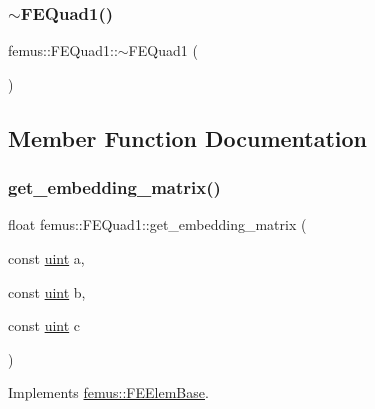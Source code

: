 \mbox{\label{classfemus_1_1_f_e_quad1_ad18511a0214fb48540a985da41b0aa0c}} 
\subsubsection{\texorpdfstring{$\sim$\+F\+E\+Quad1()}{~FEQuad1()}}
{\footnotesize\ttfamily femus\+::\+F\+E\+Quad1\+::$\sim$\+F\+E\+Quad1 (\begin{DoxyParamCaption}{ }\end{DoxyParamCaption})}



\subsection{Member Function Documentation}
\mbox{\label{classfemus_1_1_f_e_quad1_a28f67697594e281a16e395df3ee3ae54}} 
\subsubsection{\texorpdfstring{get\+\_\+embedding\+\_\+matrix()}{get\_embedding\_matrix()}}
{\footnotesize\ttfamily float femus\+::\+F\+E\+Quad1\+::get\+\_\+embedding\+\_\+matrix (\begin{DoxyParamCaption}\item[{const \mbox{\hyperlink{_typedefs_8hpp_a91ad9478d81a7aaf2593e8d9c3d06a14}{uint}}}]{a,  }\item[{const \mbox{\hyperlink{_typedefs_8hpp_a91ad9478d81a7aaf2593e8d9c3d06a14}{uint}}}]{b,  }\item[{const \mbox{\hyperlink{_typedefs_8hpp_a91ad9478d81a7aaf2593e8d9c3d06a14}{uint}}}]{c }\end{DoxyParamCaption})\hspace{0.3cm}{\ttfamily [virtual]}}



Implements \mbox{\hyperlink{classfemus_1_1_f_e_elem_base_a0c4d6d5ec66bd4e301eb8ea2ef10f354}{femus\+::\+F\+E\+Elem\+Base}}.

